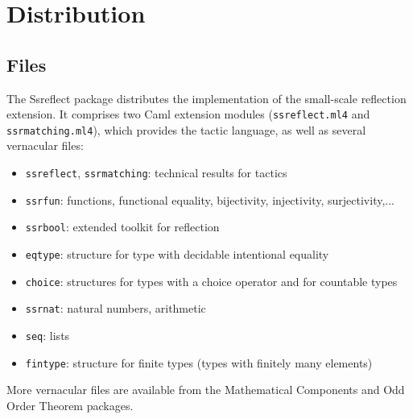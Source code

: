 \section{Distribution}

\subsection{Files}\label{sec:files}
The Ssreflect package distributes the implementation of the
small-scale reflection extension. It comprises
two Caml extension modules ({\tt ssreflect.ml4} and {\tt
  ssrmatching.ml4}), which provides the tactic language, as well as several
\Coq{} vernacular files:
\begin{itemize}
\item {\tt ssreflect}, {\tt ssrmatching}: technical results for \ssr{} tactics
\item {\tt ssrfun}: functions, functional equality, bijectivity,
  injectivity, surjectivity,...
\item {\tt ssrbool}: extended toolkit for reflection
\item {\tt eqtype}: structure for type with decidable intentional equality
\item {\tt choice}: structures for types with a choice operator and for
  countable types
\item {\tt ssrnat}: natural numbers, arithmetic
\item {\tt seq}: lists
\item {\tt fintype}: structure for finite types
          (types with finitely many elements)
\end{itemize}
More \Coq{} vernacular files are available from the
Mathematical Components and Odd Order Theorem packages.


